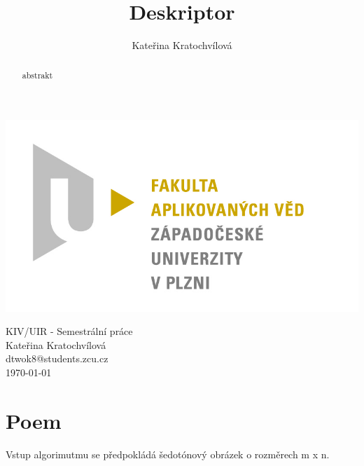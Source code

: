 \documentclass{report}
\title{Deskriptor}
\author{Kateřina Kratochvílová}
\begin{document}
 
\begin{titlepage}
\begin{flushleft} 
{\includegraphics[width=.5\textwidth]{./img/fav_logo.jpg}\\[3cm]}
\end{flushleft}
\begin{center}

{\Huge KIV/UIR - Semestrální práce}
\\[0.3cm]
\vspace{1.7cm}
{\Large Kateřina Kratochvílová} \\
\vspace{0.2cm}
{\normalsize dtwok8@students.zcu.cz}\\

{\large \today}
\end{center}
\end{titlepage}


\tableofcontents

\begin{abstract}
abstrakt  
\end{abstract}


\chapter{Poem}
Vstup algorimutmu se předpokládá šedotónový obrázek o rozměrech  m x n.
\end{document}
